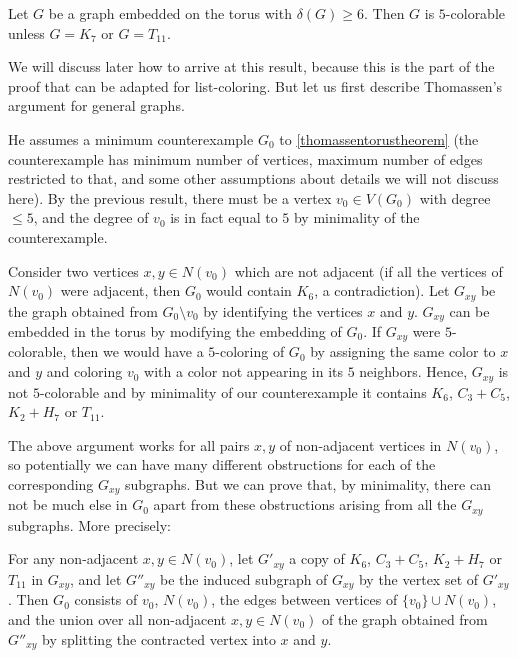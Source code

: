 \begin{theorem}
Let $G$ be a graph embedded on the torus with $\delta(G) \geq 6$. Then $G$ is $5$-colorable 
unless $G = K_7$ or $G = T_{11}$.
\end{theorem}

We will discuss later how to arrive at this result, because this is the part of the proof that 
can be adapted for list-coloring. But let us first describe Thomassen's argument for 
general graphs.

He assumes a minimum counterexample $G_0$ to \ref{thomassentorustheorem} (the counterexample has
minimum number of vertices, maximum number of edges restricted to that, and some other assumptions 
about details we will not discuss here). By the previous result, 
there must be a vertex $v_0 \in V(G_0)$ with degree $\leq 5$, and the degree of $v_0$ is in 
fact equal to $5$ by minimality of the counterexample. 

Consider two vertices $x, y \in N(v_0)$ which are not adjacent (if all the vertices of 
$N(v_0)$ were adjacent, then $G_0$ would contain $K_6$, a contradiction). Let $G_{xy}$ be 
the graph obtained from $G_0 \setminus v_0$ by identifying the vertices $x$ and $y$. 
$G_{xy}$ can be embedded in the torus by modifying the embedding of $G_0$. If $G_{xy}$ 
were $5$-colorable, then we would have a $5$-coloring of $G_0$ by assigning the same color 
to $x$ and $y$ and coloring $v_0$ with a color not appearing in its $5$ neighbors. 
Hence, $G_{xy}$ is not $5$-colorable and by minimality of our counterexample it 
contains $K_6$, $C_3 + C_5$, $K_2 + H_7$ or $T_{11}$.

The above argument works for all pairs $x, y$ of non-adjacent vertices in $N(v_0)$, so potentially 
we can have many different obstructions for each of the corresponding $G_{xy}$ subgraphs. 
But we can prove that, by minimality, there can not be much else in $G_0$ apart from these
obstructions arising from all the $G_{xy}$ subgraphs. More precisely:  

\begin{proposition}
	\label{g0proposition}
	For any non-adjacent $x, y \in N(v_0)$, let $G'_{xy}$ a copy of 
	$K_6$, $C_3 + C_5$, $K_2 + H_7$ or $T_{11}$ in $G_{xy}$, and let $G''_{xy}$ be the induced
	subgraph of $G_{xy}$ by the vertex set of $G'_{xy}$. Then $G_0$ consists of $v_0$, $N(v_0)$, 
	the edges between vertices of $\{v_0\} \cup N(v_0)$, and the union over all non-adjacent 
	$x, y \in N(v_0)$ of the graph obtained from $G''_{xy}$ by splitting the contracted vertex
	into $x$ and $y$.  
\end{proposition}

